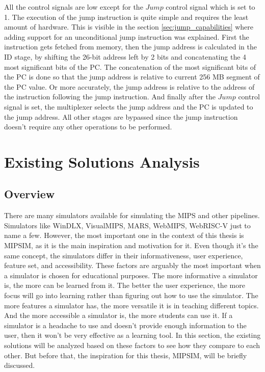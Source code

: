 All the control signals are low except for the $Jump$ control signal which is set to 1. The execution of the jump instruction is quite simple and requires the least amount of hardware. This is visible in the section \ref{sec:jump_capabilities} where adding support for an unconditional jump instruction was explained. First the instruction gets fetched from memory, then the jump address is calculated in the ID stage, by shifting the 26-bit address left by 2 bits and concatenating the 4 most significant bits of the PC. The concatenation of the most significant bits of the PC is done so that the jump address is relative to current 256 MB segment of the PC value. Or more accurately, the jump address is relative to the address of the instruction following the jump instruction. And finally after the $Jump$ control signal is set, the multiplexer selects the jump address and the PC is updated to the jump address. All other stages are bypassed since the jump instruction doesn't require any other operations to be performed.




\section {Existing Solutions Analysis}

\subsection {Overview}\label{sec:existing_solutions_overview}
There are many simulators available for simulating the MIPS and other pipelines. Simulators like WinDLX\cite{grunbacher1996windlx}, VisualMIPS\cite{visualmips}, MARS\cite{mars}, WebMIPS\cite{webmpis}, WebRISC-V\cite{giorgi2019webriscv} just to name a few. However, the most important one in the context of this thesis is MIPSIM\cite{grunbacher1996windlx}, as it is the main inspiration and motivation for it. Even though it's the same concept, the simulators differ in their informativeness, user experience, feature set, and accessibility. These factors are arguably the most important when a simulator is chosen for educational purposes. The more informative a simulator is, the more can be learned from it. The better the user experience, the more focus will go into learning rather than figuring out how to use the simulator. The more features a simulator has, the more versatile it is in teaching different topics. And the more accessible a simulator is, the more students can use it.
If a simulator is a headache to use and doesn't provide enough information to the user, then it won't be very effective as a learning tool. In this section, the existing solutions will be analyzed based on these factors to see how they compare to each other.
But before that, the inspiration for this thesis, MIPSIM, will be briefly discussed.


